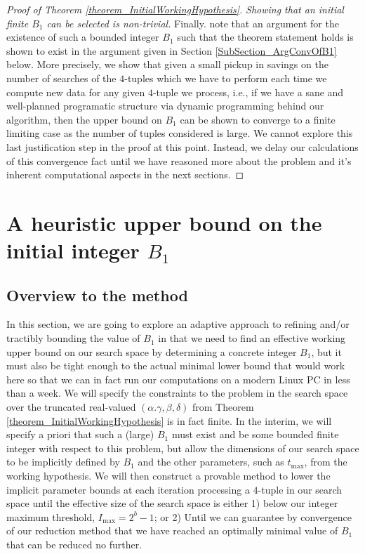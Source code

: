 \documentclass[12pt]{article}
\begin{document}
\begin{proof}[Proof of Theorem \ref{theorem_InitialWorkingHypothesis}]
\bigskip\noindent
\textit{Showing that an initial finite $B_1$ can be selected is non-trivial.} 
Finally. note that an argument for the existence of such a bounded integer $B_1$ such that the theorem 
statement holds is shown to exist in the argument given in 
Section \ref{SubSection_ArgConvOfB1} below. More precisely, we show that given a small pickup in savings on the 
number of searches of the $4$-tuples which we have to perform each time we compute new data for any given 
$4$-tuple we process, i.e., if we have a sane and well-planned programatic structure via dynamic 
programming behind our algorithm, then the upper bound on $B_1$ can be shown to converge to a finite 
limiting case as the number of tuples considered is large. We cannot explore this last justification step 
in the proof at this point. Instead, we delay our calculations of this convergence fact until we have 
reasoned more about the problem and it's inherent computational aspects in the next sections. 
\end{proof} 

\section{A heuristic upper bound on the initial integer $B_1$} 

\subsection{Overview to the method} 

In this section, we are going to explore an adaptive 
approach to refining and/or tractibly bounding the value of $B_1$ in that 
we need to find an effective working upper bound on our search space by determining a concrete integer 
$B_1$, but it must also be tight enough to the actual minimal lower bound that would work here so that 
we can in fact run our computations on a modern Linux PC in less than a week. 
We will specify the constraints to the problem in the search space over the truncated real-valued 
$(\alpha.\gamma,\beta,\delta)$ from Theorem \ref{theorem_InitialWorkingHypothesis} 
is in fact finite. In the interim, we will specify a priori that such a (large) $B_1$ must exist and 
be some bounded finite integer with respect to this problem, but allow the dimensions of our 
search space to be implicitly defined by $B_1$ and the other parameters, such as $t_{\max}$, from the 
working hypothesis. We will then construct a provable method to lower the implicit parameter bounds at 
each iteration processing a $4$-tuple in our search space until the effective size of the search space 
is either 1) below our integer maximum threshold, $I_{\max} = 2^b-1$; or 2) Until we can guarantee by 
convergence of our reduction method that we have reached an optimally minimal value of $B_1$ that can be 
reduced no further. 
\end{document}
